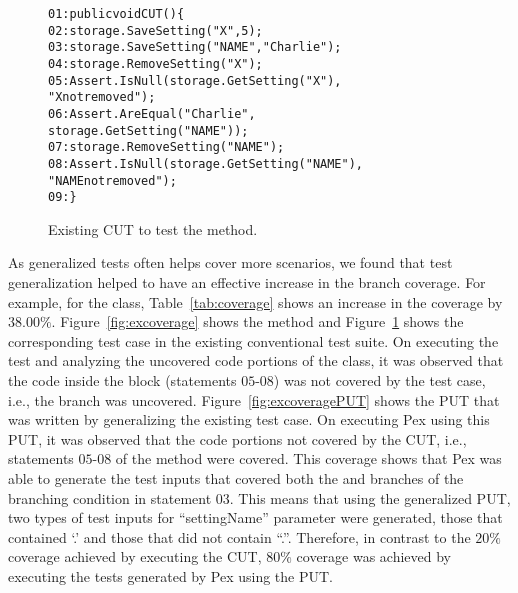 \begin{figure}[t]
\begin{CodeOut}
\begin{alltt}
01: public void CUT() \{
02: \hspace*{0.07in}storage.SaveSetting("X",5);
03: \hspace*{0.07in}storage.SaveSetting("NAME","Charlie");
04: \hspace*{0.07in}storage.RemoveSetting("X");
05: \hspace*{0.07in}Assert.IsNull(storage.GetSetting("X"),
\hspace*{1.0in}"X not removed");
06: \hspace*{0.07in}Assert.AreEqual("Charlie", 
\hspace{1.0in}storage.GetSetting( "NAME" ) );
07: \hspace*{0.07in}storage.RemoveSetting("NAME");
08: \hspace*{0.07in}Assert.IsNull( storage.GetSetting("NAME"), 
\hspace*{1.8in}"NAME not removed" ); 
09: \hspace*{0.02in}\}
\end{alltt}
\end{CodeOut}
\caption{Existing CUT to test the  method.}%
\label{fig:excoveragetest}%
\end{figure}

As generalized tests often helps cover more scenarios, we found that test generalization helped to have an effective increase in the branch coverage. For example, for the  class, Table~\ref{tab:coverage} shows an increase in the coverage by $38.00\%$. Figure~\ref{fig:excoverage} shows the  method and Figure~\ref{fig:excoveragetest} shows the corresponding test case in the existing conventional test suite. On executing the test and analyzing the uncovered code portions of the  class, it was observed that the code inside the  block (statements $05$-$08$) was not covered by the test case, i.e., the  branch was uncovered. Figure~\ref{fig:excoveragePUT} shows the PUT that was written by generalizing the existing test case. On executing Pex using this PUT, it was observed that the code portions not covered by the CUT, i.e., statements $05$-$08$ of the  method were covered. This coverage shows that Pex was able to generate the test inputs that covered both the  and  branches of the branching condition in statement $03$. This means that using the generalized PUT, two types of test inputs for ``settingName'' parameter were generated, those that contained `.' and those that did not contain ``.''. Therefore, in contrast to the $20\%$ coverage achieved by executing the CUT, $80\%$ coverage was achieved by executing the tests generated by Pex using the PUT. 

